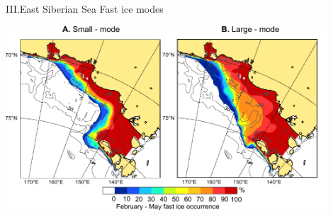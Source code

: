 \documentclass[8pt]{beamer}
\begin{document}
\setwatermark{\fontsize{125pt}{125pt}\selectfont{}}
\begin{frame}[fragile]{III.East Siberian Sea Fast ice modes}
\begin{center}
	\includegraphics[width=0.9\textwidth]{./img/ESS_modes.pdf}
\end{center}
\end{frame}
\end{document}
